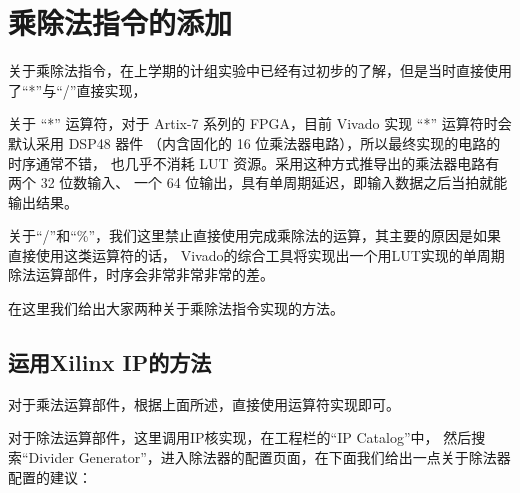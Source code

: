 \section{乘除法指令的添加}\label{s: lab3}


关于乘除法指令，在上学期的计组实验中已经有过初步的了解，但是当时直接使用了``*''与``/''直接实现，

关于 ``*'' 运算符，对于 Artix-7 系列的 FPGA，目前 Vivado 实现 ``*'' 运算符时会默认采用 DSP48 器件
（内含固化的 16 位乘法器电路），所以最终实现的电路的时序通常不错，
也几乎不消耗 LUT 资源。采用这种方式推导出的乘法器电路有两个 32 位数输入、
一个 64 位输出，具有单周期延迟，即输入数据之后当拍就能输出结果。

关于``/''和``\%''，我们这里禁止直接使用完成乘除法的运算，其主要的原因是如果直接使用这类运算符的话，
Vivado的综合工具将实现出一个用LUT实现的单周期除法运算部件，时序会非常非常非常的差。

在这里我们给出大家两种关于乘除法指令实现的方法。

\subsection{运用Xilinx IP的方法}

对于乘法运算部件，根据上面所述，直接使用运算符实现即可。

对于除法运算部件，这里调用IP核实现，在工程栏的``IP Catalog''中，
然后搜索``Divider Generator''，进入除法器的配置页面，在下面我们给出一点关于除法器配置的建议：

